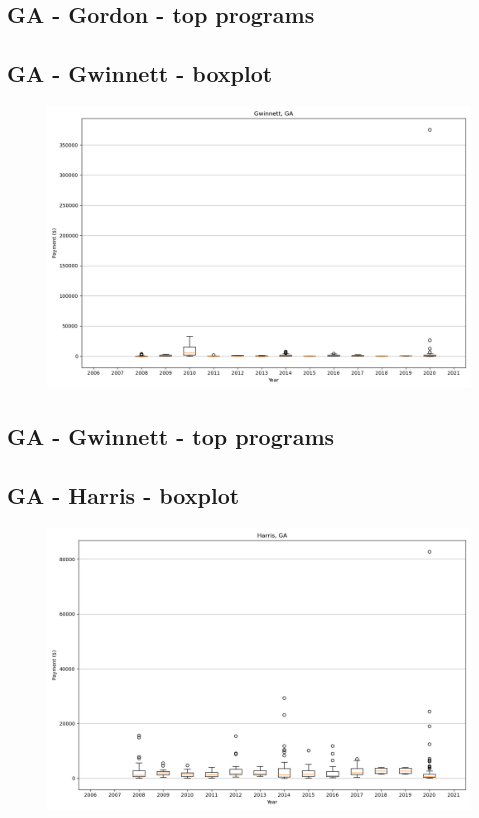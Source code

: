 \subsection*{GA - Gordon - top programs}

\newpage
\subsection*{GA - Gwinnett - boxplot}
\begin{figure}[h]
\centering
\includegraphics[width=7in]{../output/boxplots/counties/Gwinnett-GA_boxplot.png}
\end{figure}


\subsection*{GA - Gwinnett - top programs}

\newpage
\subsection*{GA - Harris - boxplot}
\begin{figure}[h]
\centering
\includegraphics[width=7in]{../output/boxplots/counties/Harris-GA_boxplot.png}
\end{figure}


